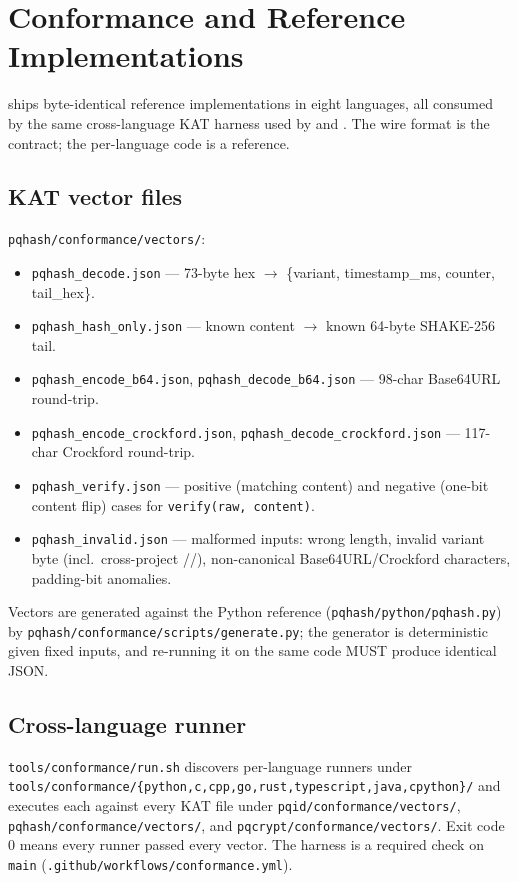 \section{Conformance and Reference Implementations}
\label{sec:conformance}

\pqhash{} ships byte-identical reference implementations in eight languages, all consumed by the same cross-language KAT harness used by \pqid{} and \pqcrypt{}. The wire format is the contract; the per-language code is a reference.

\subsection{KAT vector files}

\texttt{pqhash/conformance/vectors/}:

\begin{itemize}
\item \texttt{pqhash\_decode.json} --- 73-byte hex $\to$ \{variant, timestamp\_ms, counter, tail\_hex\}.
\item \texttt{pqhash\_hash\_only.json} --- known content $\to$ known 64-byte SHAKE-256 tail.
\item \texttt{pqhash\_encode\_b64.json}, \texttt{pqhash\_decode\_b64.json} --- 98-char Base64URL round-trip.
\item \texttt{pqhash\_encode\_crockford.json}, \texttt{pqhash\_decode\_crockford.json} --- 117-char Crockford round-trip.
\item \texttt{pqhash\_verify.json} --- positive (matching content) and negative (one-bit content flip) cases for \texttt{verify(raw, content)}.
\item \texttt{pqhash\_invalid.json} --- malformed inputs: wrong length, invalid variant byte (incl.\ cross-project //), non-canonical Base64URL/Crockford characters, padding-bit anomalies.
\end{itemize}

Vectors are generated against the Python reference (\texttt{pqhash/python/pqhash.py}) by \texttt{pqhash/conformance/scripts/generate.py}; the generator is deterministic given fixed inputs, and re-running it on the same code MUST produce identical JSON.

\subsection{Cross-language runner}

\texttt{tools/conformance/run.sh} discovers per-language runners under \texttt{tools/conformance/\{python,c,cpp,go,rust,typescript,java,cpython\}/} and executes each against every KAT file under \texttt{pqid/conformance/vectors/}, \texttt{pqhash/conformance/vectors/}, and \texttt{pqcrypt/conformance/vectors/}. Exit code 0 means every runner passed every vector. The harness is a required check on \texttt{main} (\texttt{.github/workflows/conformance.yml}).

